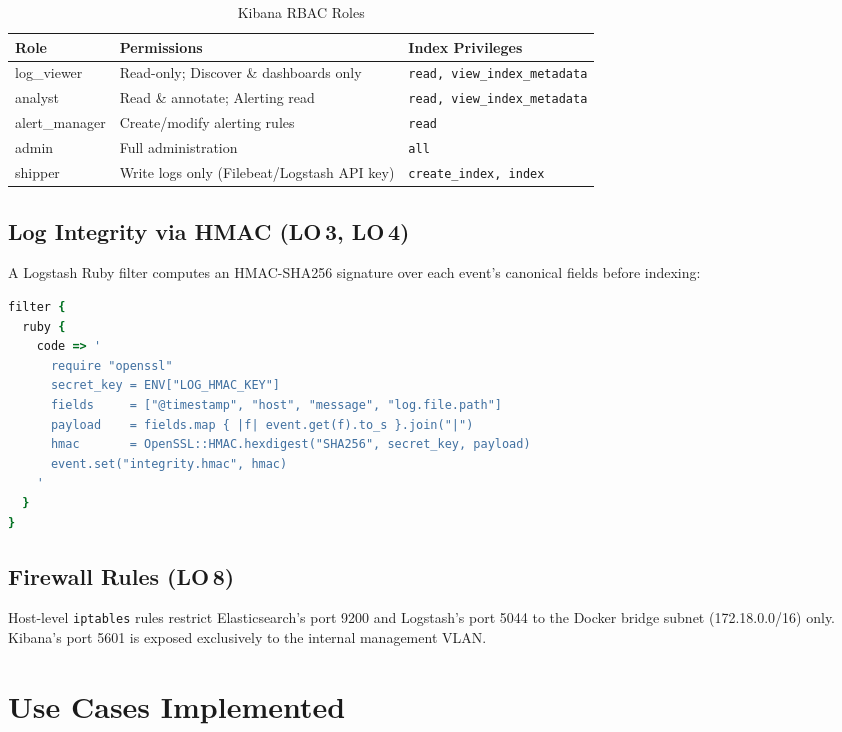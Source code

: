 \documentclass[12pt,a4paper]{report}
\begin{document}
\begin{table}[H]
\centering
\caption{Kibana RBAC Roles}
\label{tab:rbac}
\begin{tabularx}{\textwidth}{lXl}
\toprule
\textbf{Role} & \textbf{Permissions} & \textbf{Index Privileges} \\
\midrule
log\_viewer    & Read-only; Discover \& dashboards only  & \texttt{read, view\_index\_metadata} \\
analyst        & Read \& annotate; Alerting read         & \texttt{read, view\_index\_metadata} \\
alert\_manager & Create/modify alerting rules             & \texttt{read} \\
admin          & Full administration                      & \texttt{all} \\
shipper        & Write logs only (Filebeat/Logstash API key) & \texttt{create\_index, index} \\
\bottomrule
\end{tabularx}
\end{table}

\subsection{Log Integrity via HMAC (LO\,3, LO\,4)}

A Logstash Ruby filter computes an HMAC-SHA256 signature over each event's canonical
fields before indexing:

\begin{lstlisting}[language=ruby, caption={Logstash HMAC integrity filter}]
filter {
  ruby {
    code => '
      require "openssl"
      secret_key = ENV["LOG_HMAC_KEY"]
      fields     = ["@timestamp", "host", "message", "log.file.path"]
      payload    = fields.map { |f| event.get(f).to_s }.join("|")
      hmac       = OpenSSL::HMAC.hexdigest("SHA256", secret_key, payload)
      event.set("integrity.hmac", hmac)
    '
  }
}
\end{lstlisting}

\subsection{Firewall Rules (LO\,8)}

Host-level \texttt{iptables} rules restrict Elasticsearch's port 9200 and Logstash's
port 5044 to the Docker bridge subnet (172.18.0.0/16) only.
Kibana's port 5601 is exposed exclusively to the internal management VLAN.

\section{Use Cases Implemented}
\end{document}
